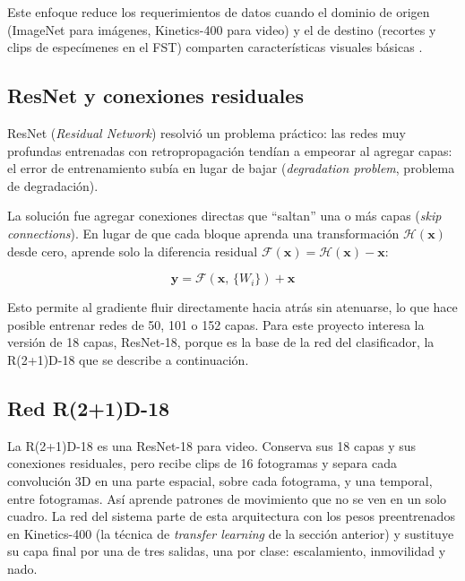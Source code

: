 Este enfoque reduce los requerimientos de datos cuando el dominio de origen (ImageNet
para imágenes, Kinetics-400 para video) y el de destino (recortes y clips de especímenes en el FST) comparten características visuales básicas
\cite{pan2010}.

\subsection{ResNet y conexiones residuales}

ResNet (\textit{Residual Network}) \cite{he2016} resolvió un problema práctico: las
redes muy profundas entrenadas con retropropagación tendían a empeorar al agregar capas:
el error de entrenamiento subía en lugar de bajar (\textit{degradation problem},
problema de degradación).

La solución fue agregar conexiones directas que ``saltan'' una o más capas
(\textit{skip connections}). En lugar de que cada bloque aprenda una transformación
$\mathcal{H}(\mathbf{x})$ desde cero, aprende solo la diferencia residual
$\mathcal{F}(\mathbf{x}) = \mathcal{H}(\mathbf{x}) - \mathbf{x}$:

\begin{equation}
    \mathbf{y} = \mathcal{F}(\mathbf{x},\, \{W_i\}) + \mathbf{x}
    \label{eq:resnet}
\end{equation}

Esto permite al gradiente fluir directamente hacia atrás sin atenuarse, lo que hace
posible entrenar redes de 50, 101 o 152 capas. Para este proyecto interesa la versión
de 18 capas, ResNet-18, porque es la base de la red del clasificador, la R(2+1)D-18
que se describe a continuación.

\subsection{Red R(2+1)D-18}

La R(2+1)D-18 \cite{tran2018} es una ResNet-18 para video. Conserva sus 18 capas y sus
conexiones residuales, pero recibe clips de 16 fotogramas y separa cada convolución 3D
en una parte espacial, sobre cada fotograma, y una temporal, entre fotogramas. Así
aprende patrones de movimiento que no se ven en un solo cuadro. La red del sistema parte
de esta arquitectura con los pesos preentrenados en Kinetics-400 (la técnica de
\textit{transfer learning} de la sección anterior) y sustituye su capa final por una de tres
salidas, una por clase: escalamiento, inmovilidad y nado.

